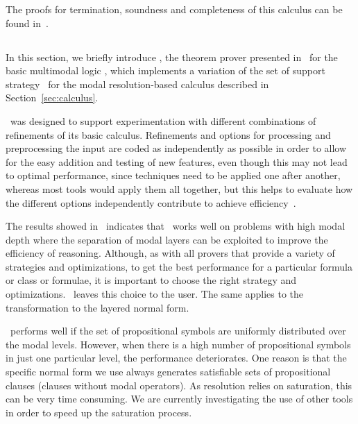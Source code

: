 The proofs for termination, soundness and completeness of this calculus can be
found in~\cite{nalon2015modal}.

\subsection{\ksp}
In this section, we briefly introduce \ksp, the theorem prover presented
in~\cite{Nalon2016} for the basic multimodal logic , which
implements a variation of the set of support strategy~\cite{wos1965efficiency}
for the modal resolution-based calculus described in Section~\ref{sec:calculus}.

\ksp\ was designed to support experimentation with different combinations of
refinements of its basic calculus. Refinements and options for processing and
preprocessing the input are coded as independently as possible in order to allow
for the easy addition and testing of new features, even though this may not lead
to optimal performance, since techniques need to be applied one after another,
whereas most tools would apply them all together, but this helps to evaluate how
the different options independently contribute to achieve
efficiency~\cite{Nalon2016}. 

The results showed in~\cite{Nalon2016} indicates that \ksp\ works well on
problems with high modal depth where the separation of modal layers can be
exploited to improve the efficiency of reasoning. Although, as with all provers
that provide a variety of strategies and optimizations, to get the best
performance for a particular formula or class or formulae, it is important to
choose the right strategy and optimizations. \ksp\ leaves this choice to the
user. The same applies to the transformation to the layered normal form.

\ksp\ performs well if the set of propositional symbols are uniformly distributed
over the modal levels. However, when there is a high number of propositional
symbols in just one particular level, the performance deteriorates. One reason
is that the specific normal form we use always generates satisfiable sets of
propositional clauses (clauses without modal operators). As resolution relies on
saturation, this can be very time consuming. We are currently investigating the
use of other tools in order to speed up the saturation process.

